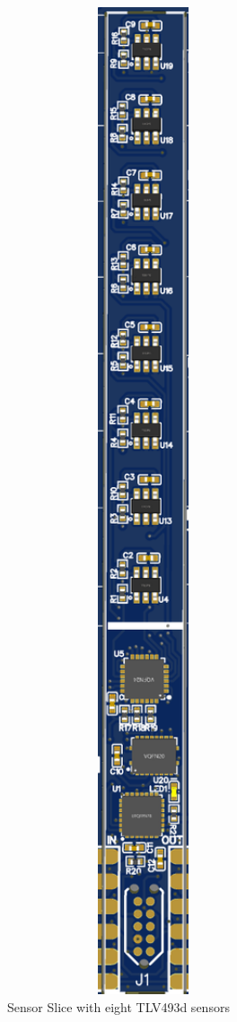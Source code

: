 \documentclass[conference]{IEEEtran}
\begin{document}
\begin{figure}[htbp]
\centerline{\includegraphics[width=8cm]{magcam_sensor_module.png}}
\caption{Sensor Slice with eight TLV493d sensors}
\label{magcam_sensor_module_fig}
\end{figure}
\end{document}
